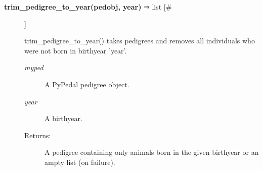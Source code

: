 \documentclass{article}
\begin{document}
\begin{description}
\item[\textbf{trim\_pedigree\_to\_year(pedobj, year)} ⇒ list [\#]
]
\par trim\_pedigree\_to\_year() takes pedigrees and removes all individuals who were not born
in birthyear 'year'.
\begin{description}
\item[\textit{myped}
]
A PyPedal pedigree object.
\item[\textit{year}
]
A birthyear.
\item[Returns:
]
A pedigree containing only animals born in the given birthyear or an ampty list (on failure).
\end{description}\\

\end{description}
\end{document}
